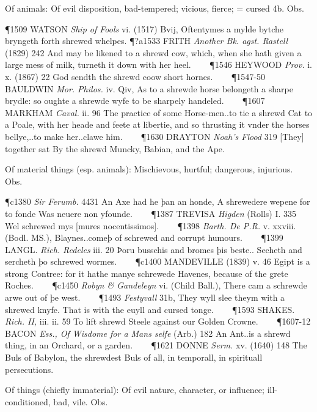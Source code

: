 \begin{description}[wide, labelwidth=!, labelindent=0pt]
\begin{myenumerate}
 Of animals: Of evil disposition, bad-tempered; vicious, fierce; = cursed 4b. Obs.

\P 1509 WATSON  \textit{Ship of Fools} vi. (1517) Bvij, Oftentymes a mylde bytche bryngeth forth shrewed whelpes.
\P ?a1533 FRITH  \textit{Another Bk. agst. Rastell} (1829) 242 And may be likened to a shrewd cow, which, when she hath given a large mess of milk, turneth it down with her heel.    
\P 1546 HEYWOOD  \textit{Prov.} i. x. (1867) 22 God sendth the shrewd coow short hornes.    
\P 1547-50 BAULDWIN  \textit{Mor. Philos.} iv. Qiv, As to a shrewde horse belongeth a sharpe brydle: so oughte a shrewde wyfe to be sharpely handeled.    
\P 1607 MARKHAM  \textit{Caval.} ii. 96 The practice of some Horse-men..to tie a shrewd Cat to a Poale, with her heade and feete at libertie, and so thrusting it vnder the horses bellye,..to make her..clawe him.    
\P 1630 DRAYTON  \textit{Noah's Flood} 319 [They] together sat By the shrewd Muncky, Babian, and the Ape.

 Of material things (esp. animals): Mischievous, hurtful; dangerous, injurious. Obs.

\P c1380  \textit{Sir Ferumb.} 4431 An Axe had he þan an honde, A shrewedere wepene for to fonde Was neuere non yfounde.    
\P 1387 TREVISA  \textit{Higden} (Rolls) I. 335 Wel schrewed mys [mures nocentissimos].    
\P 1398  \textit{ Barth. De P.R.} v. xxviii. (Bodl. MS.), Blaynes..comeþ of schrewed and corrupt humours.    
\P 1399 LANGL.  \textit{Rich. Redeles} iii. 20 Þoru busschis and bromes þis beste.. Secheth and sercheth þo schrewed wormes.    
\P c1400 MANDEVILLE  (1839) v. 46 Egipt is a strong Contree: for it hathe manye schrewede Havenes, because of the grete Roches.    
\P c1450 \textit{Robyn \& Gandeleyn}  vi. (Child Ball.), There cam a schrewde arwe out of þe west.    
\P 1493 \textit{Festyvall}  31b, They wyll slee theym with a shrewed knyfe. That is with the euyll and cursed tonge.    
\P 1593 SHAKES.  \textit{Rich. II,} iii. ii. 59 To lift shrewd Steele against our Golden Crowne.    
\P 1607-12 BACON  \textit{Ess., Of Wisdome for a Mans selfe} (Arb.) 182 An Ant..is a shrewd thing, in an Orchard, or a garden.    
\P 1621 DONNE  \textit{Serm.} xv. (1640) 148 The Buls of Babylon, the shrewdest Buls of all, in temporall, in spirituall persecutions.

 Of things (chiefly immaterial): Of evil nature, character, or influence; ill-conditioned, bad, vile. Obs.


\end{myenumerate}
\end{description}
